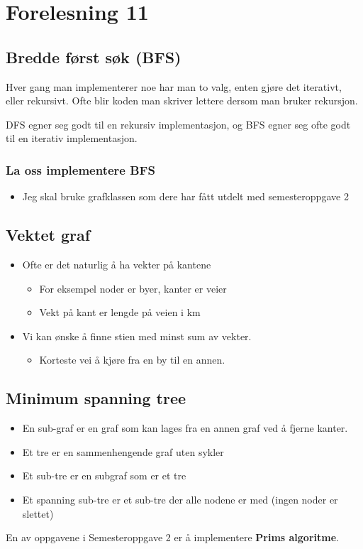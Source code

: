 \documentclass{article}
\begin{document}
    \section{Forelesning 11}

    \subsection{Bredde først søk (BFS)}
    Hver gang man implementerer noe har man to valg, enten gjøre det iterativt, eller rekursivt. Ofte blir koden man skriver lettere dersom man bruker rekursjon.
    \medskip

    DFS egner seg godt til en rekursiv implementasjon, og BFS egner seg ofte godt til en iterativ implementasjon.

    \subsubsection{La oss implementere BFS}
    \begin{itemize}
        \item Jeg skal bruke grafklassen som dere har fått utdelt med semesteroppgave 2
    \end{itemize}

    \subsection{Vektet graf}
    \begin{itemize}
        \item Ofte er det naturlig å ha vekter på kantene
            \begin{itemize}
                \item For eksempel noder er byer, kanter er veier
                \item Vekt på kant er lengde på veien i km
            \end{itemize}
        \item Vi kan ønske å finne stien med minst sum av vekter.
            \begin{itemize}
                \item Korteste vei å kjøre fra en by til en annen.
            \end{itemize}
    \end{itemize}


    \subsection{Minimum spanning tree}
    \begin{itemize}
        \item En sub-graf er en graf som kan lages fra en annen graf ved å fjerne kanter.
        \item Et tre er en sammenhengende graf uten sykler
        \item Et sub-tre er en subgraf som er et tre
        \item Et spanning sub-tre er et sub-tre der alle nodene er med (ingen noder er slettet)
    \end{itemize}

    En av oppgavene i Semesteroppgave 2 er å implementere \textbf{Prims algoritme}.
\end{document}
